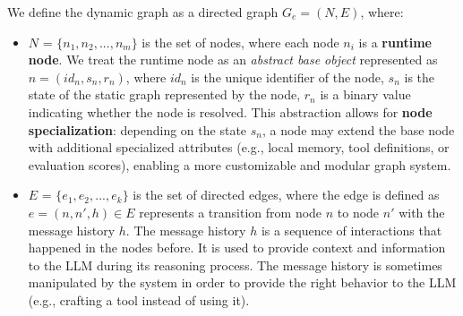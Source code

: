 \documentclass[12pt,a4paper,openright,twoside]{book}
\begin{document}
We define the dynamic graph as a directed graph $G_e = (N, E)$, where:
\begin{itemize}
    \item $N$ = $\{n_1, n_2, ..., n_m\}$ is the set of nodes, where each node $n_i$ is a \textbf{runtime node}. 
    We treat the runtime node as an \textit{abstract base object} represented as $n = (id_n, s_n, r_n)$,
    where $id_n$ is the unique identifier of the node,
    $s_n$ is the state of the static graph represented by the node,
    $r_n$ is a binary value indicating whether the node is resolved.
    This abstraction allows for \textbf{node specialization}: depending on the state $s_n$, a node may extend the base node with additional specialized attributes (e.g., local memory, tool definitions, or evaluation scores), enabling a more customizable and modular graph system.

    \item $E$ = $\{e_1, e_2, ..., e_k\}$ is the set of directed edges, where the edge is defined as $e = (n, n', h) \in E$ represents a transition from node $n$ to node $n'$ with the message history $h$. The message history $h$ is a sequence of interactions that happened in the nodes before. It is used to provide context and information to the \ac{LLM} during its reasoning process. The message history is sometimes manipulated by the system in order to provide the right behavior to the \ac{LLM} (e.g., crafting a tool instead of using it).
\end{itemize}
\end{document}
